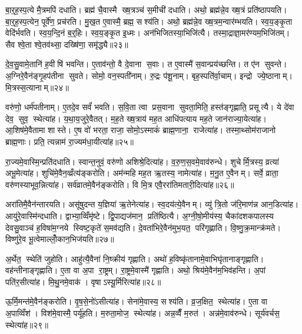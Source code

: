 बा॒र्॒ह॒स्प॒त्ये मै॒त्रमपि॑ दधाति। ब्रह्म॑ चै॒वास्मै ख्ष॒त्रञ्च॑ स॒मीची॑ दधाति। अथो॒ ब्रह्म॑न्ने॒व ख्ष॒त्रं प्रति॑ष्ठापयति। बा॒र्॒ह॒स्प॒त्येन॒ पूर्वे॑ण॒ प्रच॑रति। मु॒ख॒त ए॒वास्मै॒ ब्रह्म॒ सश्य॑ति। अथो॒ ब्रह्म॑न्ने॒व ख्ष॒त्रम॒न्वार॑म्भयति। स्व॒य॒ङ्कृ॒ता वेदि॑र्भवति। स्व॒य॒न्दि॒नं ब॒र्॒हिः। स्व॒य॒ङ्कृ॒त इ॒ध्मः। अन॑भिजितस्या॒भिजि॑त्यै। तस्मा॒द्राज्ञा॒मर॑ण्यम॒भिजि॑तम्। सैव श्वे॒ता श्वे॒तव॑थ्सा॒ दख्षि॑णा॒ समृ॑द्ध्यै॥२३॥\anuvakamend[र॒त्नि॒त्वाय॒ समृ॑द्ध्यै पष्ठौ॒ही दख्षि॑णा॒ समृ॑द्ध्यै ग्राम॒ण्यो॑ गृ॒हे भा॑गदु॒घस्य॑ गृ॒हे भ॑वति दु॒ग्धे॑ऽभिजि॑त्यै॒ द्वे च॑]

दे॒व॒सु॒वामे॒तानि॑ ह॒वीषि॑ भवन्ति। ए॒ताव॑न्तो॒ वै दे॒वाना स॒वाः। त ए॒वास्मै॑ स॒वान्प्रय॑च्छन्ति। त ए॑न सुवन्ते। अ॒ग्निरे॒वैन॑ङ्गृ॒हप॑तीना सुवते। सोमो॒ वन॒स्पती॑नाम्। रु॒द्रः प॑शू॒नाम्। बृह॒स्पति॑र्वा॒चाम्। इन्द्रो ज्ये॒ष्ठानाम्। मि॒त्रस्स॒त्यानाम्॥२४॥

वरु॑णो॒ धर्म॑पतीनाम्। ए॒तदे॒व सर्वं॑ भवति। स॒वि॒ता त्वा प्रस॒वाना सुवता॒मिति॒ हस्त॑ङ्गृह्णाति॒ प्रसूत्यै। ये दे॑वा देव॒ सुव॒ स्थेत्या॑ह। य॒था॒य॒जुरे॒वैतत्। म॒ह॒ते ख्ष॒त्राय॑ मह॒त आधि॑पत्याय मह॒ते जान॑राज्या॒येत्या॑ह। आ॒शिष॑मे॒वैतामा शास्ते। ए॒ष वो॑ भरता॒ राजा॒ सोमो॒ऽस्माकं॑ ब्राह्म॒णाना॒ राजेत्या॑ह। तस्मा॒थ्सोम॑राजानो ब्राह्म॒णाः। प्रति॒ त्यन्नाम॑ रा॒ज्यम॑धा॒यीत्या॑ह॥२५॥

रा॒ज्यमे॒वास्मि॒न्प्रति॑दधाति। स्वान्त॒नुवं॒ वरु॑णो अशिश्रे॒दित्या॑ह। व॒रु॒ण॒स॒वमे॒वाव॑रुन्धे। शुचेर्मि॒त्रस्य॒ व्रत्या॑ अभू॒मेत्या॑ह। शुचि॑मे॒वैन॒व्व्रँत्य॑ङ्करोति। अम॑न्महि मह॒त ऋ॒तस्य॒ नामेत्या॑ह। म॒नु॒त ए॒वैनम्। सर्वे॒ व्राता॒ वरु॑णस्याभूव॒न्नित्या॑ह। सर्व॑व्रातमे॒वैन॑ङ्करोति। वि मि॒त्र एवै॒ररा॑तिमतारी॒दित्या॑ह॥२६॥

अरा॑तिमै॒वैन॑न्तारयति। असू॑षुदन्त य॒ज्ञिया॑ ऋ॒तेनेत्या॑ह। स्व॒दय॑त्ये॒वैनम्। व्यु॑ त्रि॒तो ज॑रि॒माण॑न्न आन॒डित्या॑ह। आयु॑रे॒वास्मि॑न्दधाति। द्वाभ्या॒व्विँमृ॑ष्टे। द्वि॒पाद्यज॑मान॒ प्रति॑ष्ठित्यै। अ॒ग्नी॒षो॒मीय॑स्य॒ चैका॑दशकपालस्य देवसु॒वाञ्च॑ ह॒विषा॑म॒ग्नये स्विष्ट॒कृते॑ स॒मव॑द्यति। दे॒वता॑भिरे॒वैन॑मुभ॒यत॒ परि॑गृह्णाति। वि॒ष्णु॒क्र॒मान्क्र॑मते। विष्णु॑रे॒व भू॒त्वेमाल्लोँ॒कान॒भिज॑यति॥२७॥\anuvakamend[स॒त्याना॑मधा॒यीत्या॑हातारी॒दित्या॑ह क्रमत॒ एक॑ञ्च]

अ॒र्थेत॒ स्थेति॑ जुहोति। आहु॑त्यै॒वैना॑ नि॒ष्क्रीय॑ गृह्णाति। अथो॑ ह॒विष्कृ॑तानामे॒वाभिघृ॑तानाङ्गृह्णाति। वह॑न्तीनाङ्गृह्णाति। ए॒ता वा अ॒पा रा॒ष्ट्रम्। रा॒ष्ट्रमे॒वास्मै॑ गृह्णाति। अथो॒ श्रिय॑मे॒वैन॑म॒भिव॑हन्ति। अ॒पां पति॑र॒सीत्या॑ह। मि॒थु॒नमे॒वाक॑। वृषाऽस्यू॒र्मिरित्या॑ह॥२८॥

ऊ॒र्मि॒मन्त॑मे॒वैन॑ङ्करोति। वृ॒ष॒से॒नो॑ऽसीत्या॑ह। सेना॑मे॒वास्य॒ सश्य॑ति। व्र॒ज॒क्षित॒ स्थेत्या॑ह। ए॒ता वा अ॒पाव्विँश॑। विश॑मे॒वास्मै॒ पर्यू॑हति। म॒रुता॒मोज॒ स्थेत्या॑ह। अन्न॒व्वैँ म॒रुत॑। अन्न॑मे॒वाव॑रुन्धे। सूर्य॑वर्चस॒ स्थेत्या॑ह॥२९॥

